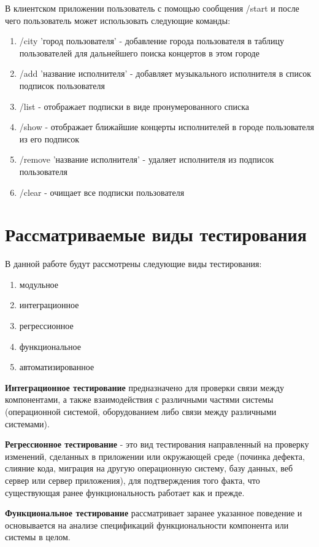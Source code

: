 В клиентском приложении пользователь с помощью сообщения /start и после чего пользователь может использовать следующие команды:
\begin{enumerate}
	\item /city 'город пользователя' - добавление города пользователя в таблицу пользователей для дальнейшего поиска концертов в этом городе
	\item /add 'название исполнителя' - добавляет музыкального исполнителя в список подписок пользователя 
	\item /list - отображает подписки в виде пронумерованного списка
	\item /show - отображает ближайшие концерты исполнителей в городе пользователя из его подписок 
	\item /remove 'название исполнителя' - удаляет исполнителя из подписок пользователя
	\item /clear - очищает все подписки пользователя 
\end{enumerate}


\section{Рассматриваемые виды тестирования}

В данной работе будут рассмотрены следующие виды тестирования:
\begin{enumerate}
	\item модульное
	\item интеграционное
	\item регрессионное
	\item функциональное
	\item автоматизированное 
	
\end{enumerate}


\textbf{Интеграционное тестирование} предназначено для проверки связи между компонентами, а также взаимодействия с различными частями системы (операционной системой, оборудованием либо связи между различными системами).

\textbf{Регрессионное тестирование} - это вид тестирования направленный на проверку изменений, сделанных в приложении или окружающей среде (починка дефекта, слияние кода, миграция на другую операционную систему, базу данных, веб сервер или сервер приложения), для подтверждения того факта, что существующая ранее функциональность работает как и прежде.

\textbf{Функциональное тестирование} рассматривает заранее указанное поведение и основывается на анализе спецификаций функциональности компонента или системы в целом. 